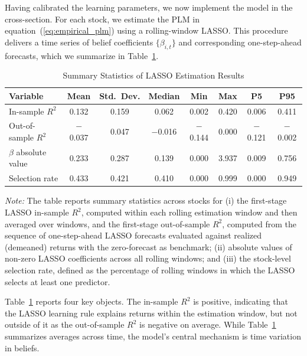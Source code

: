 \documentclass[11pt]{article}
\begin{document}
Having calibrated the learning parameters, we now implement the model in the cross-section.
For each stock, we estimate the PLM in equation~(\ref{eq:empirical_plm}) using a rolling-window LASSO.
This procedure delivers a time series of belief coefficients $\{\beta_{i,t}\}$ and corresponding one-step-ahead forecasts, which we summarize in Table~\ref{tab:summary_stats_lasso}.
\begin{table}[H]
\centering
\caption{Summary Statistics of LASSO Estimation Results}
\label{tab:summary_stats_lasso}
\begin{tabularx}{\textwidth}{@{}>{\small}Xccccccc@{}}
\toprule
Variable & Mean & Std.\ Dev. & Median & Min & Max & P5 & P95 \\
\midrule
In-sample $R^2$
& 0.132 & 0.159 & 0.062 & 0.002 & 0.420 & 0.006 & 0.411 \\

Out-of-sample $R^2$ 
& $-$0.037 & 0.047 & $-$0.016 & $-$0.144 & 0.000 & $-$0.121 & $-$0.002 \\

$\beta$ absolute value
& 0.233 & 0.287 & 0.139 & 0.000 & 3.937 & 0.009 & 0.756 \\

Selection rate
& 0.433 & 0.421 & 0.410 & 0.000 & 0.999 & 0.000 & 0.949 \\
\bottomrule
\end{tabularx}

\medskip
\begin{minipage}{\textwidth}
\footnotesize
\textit{Note:} The table reports summary statistics across stocks for
(i) the first-stage LASSO in-sample $R^2$, computed within each rolling estimation window and then averaged over windows,
and the first-stage out-of-sample $R^2$, computed from the sequence of one-step-ahead LASSO forecasts evaluated against realized (demeaned) returns with the zero-forecast as benchmark;
(ii) absolute values of non-zero LASSO coefficients across all rolling windows;
and (iii) the stock-level selection rate, defined as the percentage of rolling windows in which the LASSO selects at least one predictor.
\end{minipage}
\end{table}
Table~\ref{tab:summary_stats_lasso} reports four key objects.
The in-sample $R^2$ is positive, indicating that the LASSO learning rule explains returns within the estimation window, but not outside of it as the out-of-sample $R^2$ is negative on average.
While Table~\ref{tab:summary_stats_lasso} summarizes averages across time, the model’s central mechanism is time variation in beliefs.
\end{document}
